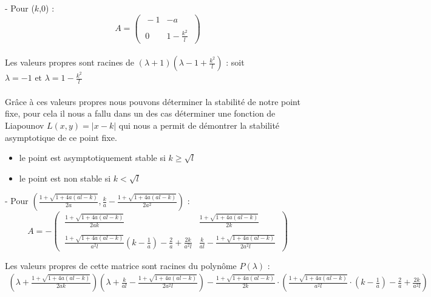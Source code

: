 \documentclass{article}
\begin{document}
\vfill
\noindent
- Pour ($k$,0) :
\begin{equation*}
    A =
    \begin{pmatrix}
        \ -1 & -a \phantom{\ }\\\\
        \ 0 & 1 - \frac{k^{2}}{l} \phantom{\ }
    \end{pmatrix}
\end{equation*}\\
Les valeurs propres sont racines de $(\lambda + 1)(\lambda - 1 + \frac{k^2}{l})$ : soit $\lambda = -1 \text{ et } \lambda = 1 - \frac{k^2}{l}$\\\\
Grâce à ces valeurs propres nous pouvons déterminer la stabilité de notre point fixe, pour cela il nous a fallu dans un des cas déterminer une fonction de Liapounov $L(x,y) = |x - k|$ qui nous a permit de démontrer la stabilité asymptotique de ce point fixe.
\begin{itemize}
    \item le point est asymptotiquement stable si $k \geqslant \sqrt{l}$
    \item le point est non stable si $k < \sqrt{l}$
\end{itemize}

\newpage

\vfill
\noindent
- Pour $\left(\frac{1 + \sqrt{1 + 4a(al -k)}}{2a}, \frac{k}{a} - \frac{1 + \sqrt{1 + 4a(al -k)}}{2a^2} \right)$ :
\begin{equation*}
    A = -
    \begin{pmatrix}
        \ \frac{1 + \sqrt{1 + 4a(al -k)}}{2ak} & \frac{1 + \sqrt{1 + 4a(al -k)}}{2k} \phantom{\ }\\\\
         \ \frac{1 + \sqrt{1 + 4a(al -k)}}{a^2 l}(k - \frac{1}{a}) - \frac{2}{a} + \frac{2k}{a^2 l} & \frac{k}{al} - \frac{1 + \sqrt{1 + 4a(al -k)}}{2a^2 l} \phantom{\ }
    \end{pmatrix}
\end{equation*}

Les valeurs propres de cette matrice sont racines du polynôme $P(\lambda)$ :
\begin{equation*}
\begin{array}{l}
    \left(\lambda + \frac{1 + \sqrt{1 + 4a(al -k)}}{2ak}\right)
    \left( \lambda + \frac{k}{al} - \frac{1 + \sqrt{1 + 4a(al -k)}}{2a^2 l} \right)
    - \frac{1+\sqrt{1 + 4a(al -k)}}{2k} \cdot \left( \frac{1 + \sqrt{1 + 4a(al -k)}}{a^2 l} \cdot \left(k - \frac{1}{a} \right) - \frac{2}{a} + \frac{2k}{a^2 l} \right)
\end{array}
\end{equation*}
\end{document}
